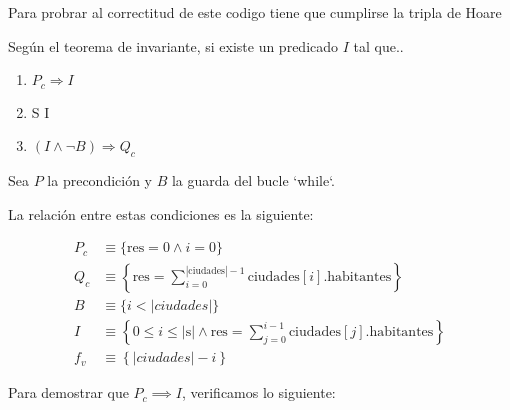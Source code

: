 \documentclass[10pt,a4paper]{article}
\begin{document}

Para probrar al correctitud de este codigo tiene que cumplirse la tripla de Hoare 

Según el teorema de invariante, si existe un predicado $I$ tal que.. \par

\begin{enumerate}
	\item $P_c \Longrightarrow I$
	\item {} {S} {I}
	\item $(I \wedge  \neg B) \Longrightarrow Q_c$
\end{enumerate}

Sea \( P \) la precondición y \( B \) la guarda del bucle `while`.

La relación entre estas condiciones es la siguiente:

\begin{align*}
	P_c & \equiv \{ \text{res} = 0 \land i = 0 \}                                                                                   \\
	Q_c & \equiv \left\{ \text{res} = \sum_{i=0}^{|\text{ciudades}|-1} \text{ciudades}[i].\text{habitantes} \right\}                \\
	B   & \equiv \{ i < |ciudades| \}                                                                                               \\
	I   & \equiv \left\{ 0 \leq i \leq |\text{s}| \land \text{res} = \sum_{j=0}^{i-1} \text{ciudades}[j].\text{habitantes} \right\} \\
	f_v & \equiv \left\{ |ciudades| - i \right\}
\end{align*}

Para demostrar que \( P_c \implies I \), verificamos lo siguiente:
\end{document}
